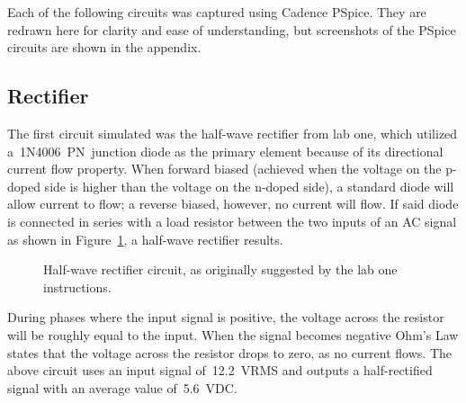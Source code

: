 Each of the following circuits was captured using Cadence PSpice.  They are
redrawn here for clarity and ease of understanding, but screenshots of the
PSpice circuits are shown in
the appendix.

\subsection{Rectifier}
The first circuit simulated was the  half-wave rectifier from lab one, which
utilized a~1N4006~PN~junction diode as the primary element because of its
directional current flow property.  When forward biased (achieved when the
voltage on the p-doped side is higher than the voltage on the n-doped side), a
standard diode will allow current to flow; a reverse biased, however, no
current will flow.  If said diode is connected in series with a load resistor
between the two inputs of an AC signal as shown in Figure~\ref{fig:schem1}, a
half-wave rectifier results.
%
\begin{figure}[H]
	\centering
	
	\parbox{3.5in}{
	\caption[Schematic --- Half-wave Rectifier]{Half-wave rectifier circuit, as
		originally suggested by the lab one instructions.}
	\label{fig:schem1}}
\end{figure}
%
During phases where the input signal is positive, the voltage across the
resistor will be roughly equal to the input.  When the signal becomes negative
Ohm's Law states that the voltage across the resistor drops to zero, as no
current flows.  The above circuit uses an input signal of~\SI{12.2}{\volt}RMS
and outputs a half-rectified signal with an average value of~\SI{5.6}{\volt}DC.


